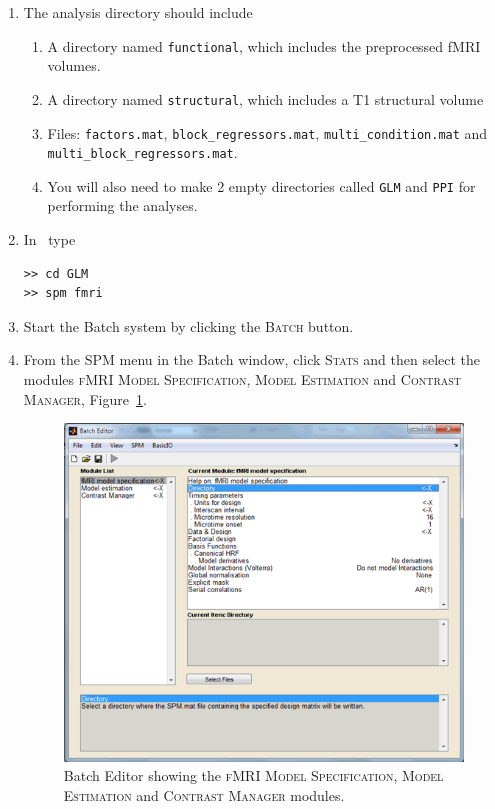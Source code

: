 \begin{enumerate}
\item The analysis directory should include
\begin{enumerate}
\item A directory named \texttt{functional}, which includes the preprocessed fMRI volumes.
\item A directory named \texttt{structural}, which includes a T1 structural volume
\item Files: \texttt{factors.mat}, \texttt{block\_regressors.mat}, \texttt{multi\_condition.mat} and \linebreak[4] \mbox{\texttt{multi\_\-block\_\-regressors.mat}}.
\item You will also need to make 2 empty directories called \texttt{GLM} and
\texttt{PPI} for performing the analyses.
\end{enumerate}

\item In \matlab\ type
\begin{verbatim}
>> cd GLM
>> spm fmri
\end{verbatim}

\item Start the Batch system by clicking the \textsc{Batch} button. 
\item From the \textsc{SPM} menu in the Batch window, click \textsc{Stats} and then select the modules \textsc{fMRI Model Specification}, \textsc{Model Estimation} and \textsc{Contrast Manager}, Figure~\ref{fig:ppi3}.

\begin{figure}[ht]
\centering\includegraphics[width=120mm]{ppi/figures/Fig3.png}
\caption{Batch Editor showing the \textsc{fMRI Model Specification}, \textsc{Model Estimation} and \textsc{Contrast Manager} modules.}
\label{fig:ppi3}
\end{figure}


\end{enumerate}
